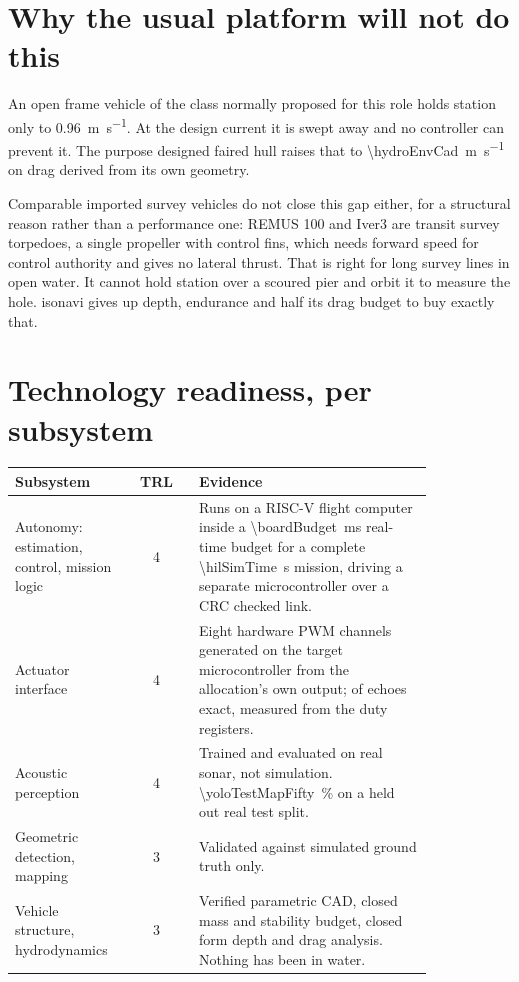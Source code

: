 \documentclass[10pt,a4paper]{article}
\begin{document}
\section*{Why the usual platform will not do this}

An open frame vehicle of the class normally proposed for this role holds
station only to \SI{0.96}{\metre\per\second}. At the design current it is
swept away and no controller can prevent it. The purpose designed faired hull
raises that to \SI{\hydroEnvCad}{\metre\per\second} on drag derived from its
own geometry.

Comparable imported survey vehicles do not close this gap either, for a
structural reason rather than a performance one: REMUS 100 and Iver3 are
transit survey torpedoes, a single propeller with control fins, which needs
forward speed for control authority and gives no lateral thrust. That is right
for long survey lines in open water. It cannot hold station over a scoured
pier and orbit it to measure the hole. isonavi gives up depth, endurance and
half its drag budget to buy exactly that.

\section*{Technology readiness, per subsystem}

\begin{center}\small
\begin{tabular}{@{}p{0.27\linewidth}c p{0.56\linewidth}@{}}
\toprule
\textbf{Subsystem} & \textbf{TRL} & \textbf{Evidence} \\
\midrule
Autonomy: estimation, control, mission logic & 4 &
Runs on a RISC-V flight computer inside a
\SI{\boardBudget}{\milli\second} real-time budget for a complete
\SI{\hilSimTime}{\second} mission, driving a separate microcontroller over a
CRC checked link. \\
Actuator interface & 4 &
Eight hardware PWM channels generated on the target microcontroller from the
allocation's own output; \espMatched{} of \espEchoes{} echoes exact, measured
from the duty registers. \\
Acoustic perception & 4 &
Trained and evaluated on real sonar, not simulation.
\SI{\yoloTestMapFifty}{\percent} on a held out real test split. \\
Geometric detection, mapping & 3 &
Validated against simulated ground truth only. \\
Vehicle structure, hydrodynamics & 3 &
Verified parametric CAD, closed mass and stability budget, closed form depth
and drag analysis. Nothing has been in water. \\
\bottomrule
\end{tabular}
\end{center}
\end{document}
